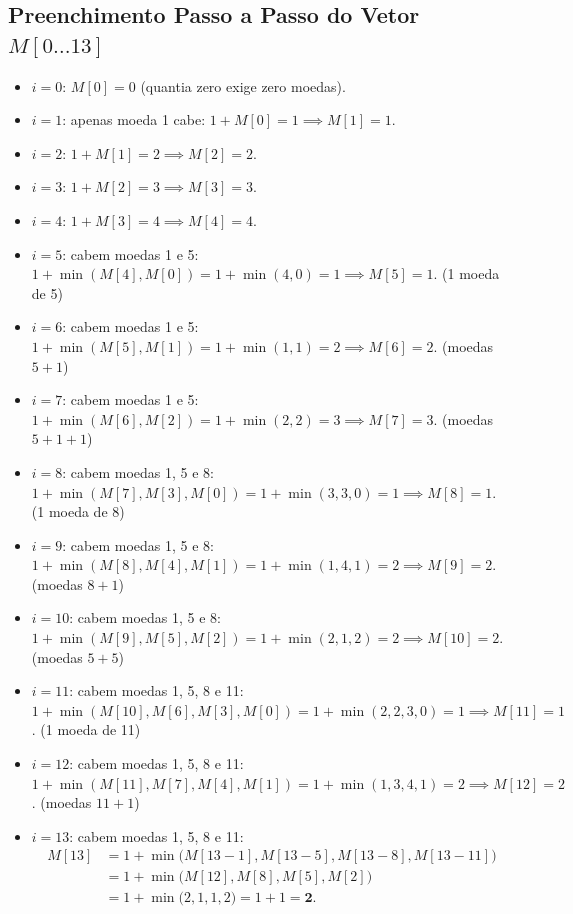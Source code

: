 \documentclass[11pt,a4paper]{article}
\begin{document}
\subsection*{Preenchimento Passo a Passo do Vetor $M[0 \dots 13]$}
\begin{itemize}
    \item $i = 0$: $M[0] = 0$ (quantia zero exige zero moedas).
    \item $i = 1$: apenas moeda 1 cabe: $1 + M[0] = 1 \implies M[1] = 1$.
    \item $i = 2$: $1 + M[1] = 2 \implies M[2] = 2$.
    \item $i = 3$: $1 + M[2] = 3 \implies M[3] = 3$.
    \item $i = 4$: $1 + M[3] = 4 \implies M[4] = 4$.
    \item $i = 5$: cabem moedas 1 e 5:
    $1 + \min(M[4], M[0]) = 1 + \min(4, 0) = 1 \implies M[5] = 1$. (1 moeda de 5)
    \item $i = 6$: cabem moedas 1 e 5:
    $1 + \min(M[5], M[1]) = 1 + \min(1, 1) = 2 \implies M[6] = 2$. (moedas $5+1$)
    \item $i = 7$: cabem moedas 1 e 5:
    $1 + \min(M[6], M[2]) = 1 + \min(2, 2) = 3 \implies M[7] = 3$. (moedas $5+1+1$)
    \item $i = 8$: cabem moedas 1, 5 e 8:
    $1 + \min(M[7], M[3], M[0]) = 1 + \min(3, 3, 0) = 1 \implies M[8] = 1$. (1 moeda de 8)
    \item $i = 9$: cabem moedas 1, 5 e 8:
    $1 + \min(M[8], M[4], M[1]) = 1 + \min(1, 4, 1) = 2 \implies M[9] = 2$. (moedas $8+1$)
    \item $i = 10$: cabem moedas 1, 5 e 8:
    $1 + \min(M[9], M[5], M[2]) = 1 + \min(2, 1, 2) = 2 \implies M[10] = 2$. (moedas $5+5$)
    \item $i = 11$: cabem moedas 1, 5, 8 e 11:
    $1 + \min(M[10], M[6], M[3], M[0]) = 1 + \min(2, 2, 3, 0) = 1 \implies M[11] = 1$. (1 moeda de 11)
    \item $i = 12$: cabem moedas 1, 5, 8 e 11:
    $1 + \min(M[11], M[7], M[4], M[1]) = 1 + \min(1, 3, 4, 1) = 2 \implies M[12] = 2$. (moedas $11+1$)
    \item $i = 13$: cabem moedas 1, 5, 8 e 11:
    \begin{align*}
    M[13] &= 1 + \min\Big( M[13-1], M[13-5], M[13-8], M[13-11] \Big) \\
          &= 1 + \min\Big( M[12], M[8], M[5], M[2] \Big) \\
          &= 1 + \min\Big( 2, 1, 1, 2 \Big) = 1 + 1 = \mathbf{2}.
    \end{align*}
\end{itemize}
\end{document}
